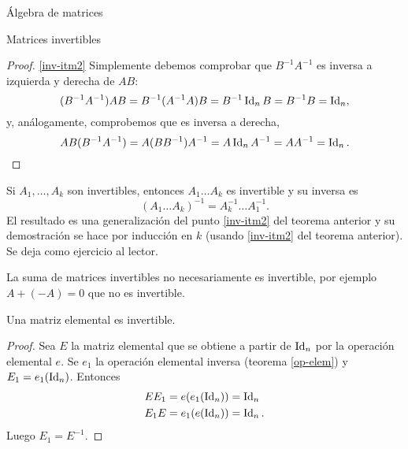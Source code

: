 \begin{chapter}{\'Algebra de matrices}
\begin{section}{Matrices invertibles}
\begin{proof}
                    \ref{inv-itm2} Simplemente debemos comprobar que $B^{-1}A^{-1}$ es inversa a izquierda y derecha de $AB$:
                    \begin{equation*}
                    (B^{-1}A^{-1})AB = B^{-1}(A^{-1}A)B = B^{-1}\operatorname{Id}_nB =B^{-1}B = \operatorname{Id}_n,
                    \end{equation*}
                    y,  análogamente, comprobemos que es inversa a derecha, 
                    \begin{equation*}
                    AB(B^{-1}A^{-1}) = A(BB^{-1})A^{-1} = A\operatorname{Id}_nA^{-1} =AA^{-1} = \operatorname{Id}_n.
                    \end{equation*} 
                \end{proof}
            
            
            \begin{observacion*}
                Si $A_1,\ldots,A_k$  son invertibles,  entonces $A_1\ldots A_k$ es invertible y su inversa es  $$(A_1\ldots A_k)^{-1} = A_k^{-1}\ldots A_1^{-1} .$$
                El resultado es una generalización del punto  \ref{inv-itm2} del teorema anterior y su demostración se hace por inducción en $k$ (usando  \ref{inv-itm2}  del teorema anterior). Se deja como ejercicio al lector. 
            \end{observacion*}
            
            \begin{observacion*}
                La suma de matrices invertibles no necesariamente es invertible, por ejemplo $A+ (-A)= 0$ que no es invertible. 
            \end{observacion*}    
            
            
            \begin{teorema}\label{th-elmental-impl-invertible}
                Una matriz elemental es invertible.
            \end{teorema}
            \begin{proof}
                Sea $E$ la matriz elemental que se obtiene a partir de $\operatorname{Id}_n$ por la operación elemental $e$. Se $e_1$ la operación elemental inversa (teorema \ref{op-elem}) y $E_1 = e_1(\operatorname{Id}_n)$. Entonces 
                \begin{align*}
                EE_1 &= e(e_1(\operatorname{Id}_n)) = \operatorname{Id}_n \\
                E_1E &= e_1(e(\operatorname{Id}_n)) = \operatorname{Id}_n.
                \end{align*}
                Luego  $E_1 = E^{-1}$. 
            \end{proof}    
            

\end{section}
\end{chapter}
